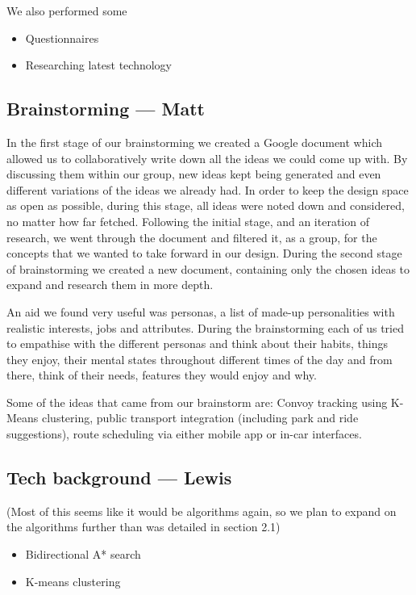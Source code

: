 \documentclass{article}
\begin{document}
We also performed some 
\begin{itemize}
  \item Questionnaires
  \item Researching latest technology
\end{itemize}

\subsection{Brainstorming --- Matt}\label{ssec:nav-brainstorming}
In the first stage of our brainstorming we created a Google document which allowed us to collaboratively write down all the ideas we could come up with. By discussing them within our group, new ideas kept being generated and even different variations of the ideas we already had. In order to keep the design space as open as possible, during this stage, all ideas were noted down and considered, no matter how far fetched. Following the initial stage, and an iteration of research, we went through the document and filtered it, as a group, for the concepts that we wanted to take forward in our design. During the second stage of brainstorming we created a new document, containing only the chosen ideas to expand and research them in more depth.

An aid we found very useful was personas, a list of made-up personalities with realistic interests, jobs and attributes. During the brainstorming each of us tried to empathise with the different personas and think about their habits, things they enjoy, their mental states throughout different times of the day and from there, think of their needs, features they would enjoy and why.

Some of the ideas that came from our brainstorm are: Convoy tracking using K-Means clustering, public transport integration (including park and ride suggestions), route scheduling via either mobile app or in-car interfaces.

\subsection{Tech background --- Lewis}\label{ssec:nav-tech}
(Most of this seems like it would be algorithms again, so we plan to expand on the algorithms further than was detailed in section 2.1)
\begin{itemize}
  \item Bidirectional A* search
  \item K-means clustering
\end{itemize}
\end{document}
